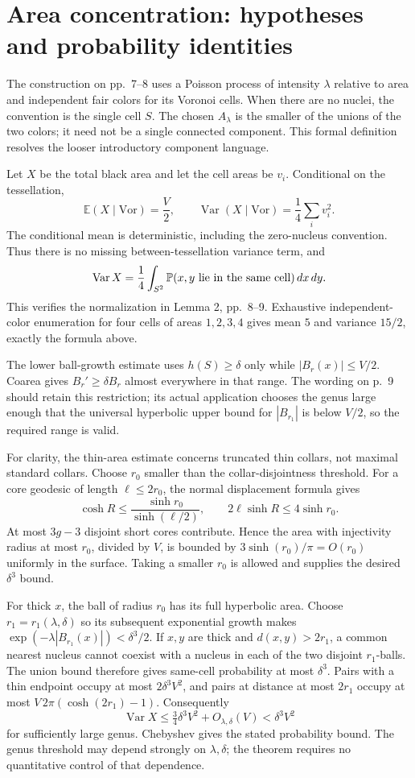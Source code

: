 \documentclass[10pt]{article}
\begin{document}
\section*{Area concentration: hypotheses and probability identities}
The construction on pp. 7–8 uses a Poisson process of intensity \(\lambda\) relative to area and independent fair colors for its Voronoi cells. When there are no nuclei, the convention is the single cell \(S\). The chosen \(A_\lambda\) is the smaller of the unions of the two colors; it need not be a single connected component. This formal definition resolves the looser introductory component language.\par
Let \(X\) be the total black area and let the cell areas be \(v_i\). Conditional on the tessellation, \[\mathbb E(X\mid\mathrm{Vor})=\frac V2,\qquad
 \operatorname{Var}(X\mid\mathrm{Vor})=\frac14\sum_i v_i^2.\] The conditional mean is deterministic, including the zero-nucleus convention. Thus there is no missing between-tessellation variance term, and \[\operatorname{Var}X
 =\frac14\int_{S^2}\mathbb P(x,y\hbox{ lie in the same cell})\,dx\,dy .\] This verifies the normalization in Lemma 2, pp. 8–9. Exhaustive independent-color enumeration for four cells of areas \(1,2,3,4\) gives mean \(5\) and variance \(15/2\), exactly the formula above.\par
The lower ball-growth estimate uses \(h(S)\geq\delta\) only while \(|B_r(x)|\leq V/2\). Coarea gives \(B_r'\geq\delta B_r\) almost everywhere in that range. The wording on p. 9 should retain this restriction; its actual application chooses the genus large enough that the universal hyperbolic upper bound for \(|B_{r_1}|\) is below \(V/2\), so the required range is valid.\par
For clarity, the thin-area estimate concerns truncated thin collars, not maximal standard collars. Choose \(r_0\) smaller than the collar-disjointness threshold. For a core geodesic of length \(\ell\leq2r_0\), the normal displacement formula gives \[\cosh R\leq \frac{\sinh r_0}{\sinh(\ell/2)},\qquad
 2\ell\sinh R\leq 4\sinh r_0.\] At most \(3g-3\) disjoint short cores contribute. Hence the area with injectivity radius at most \(r_0\), divided by \(V\), is bounded by \(3\sinh(r_0)/\pi=O(r_0)\) uniformly in the surface. Taking a smaller \(r_0\) is allowed and supplies the desired \(\delta^3\) bound.\par
For thick \(x\), the ball of radius \(r_0\) has its full hyperbolic area. Choose \(r_1=r_1(\lambda,\delta)\) so its subsequent exponential growth makes \(\exp(-\lambda|B_{r_1}(x)|)<\delta^3/2\). If \(x,y\) are thick and \(d(x,y)>2r_1\), a common nearest nucleus cannot coexist with a nucleus in each of the two disjoint \(r_1\)-balls. The union bound therefore gives same-cell probability at most \(\delta^3\). Pairs with a thin endpoint occupy at most \(2\delta^3 V^2\), and pairs at distance at most \(2r_1\) occupy at most \(V\,2\pi(\cosh(2r_1)-1)\). Consequently \[\operatorname{Var}X\leq \tfrac34\delta^3 V^2+O_{\lambda,\delta}(V)
 <\delta^3 V^2\] for sufficiently large genus. Chebyshev gives the stated probability bound. The genus threshold may depend strongly on \(\lambda,\delta\); the theorem requires no quantitative control of that dependence.\par
\end{document}
